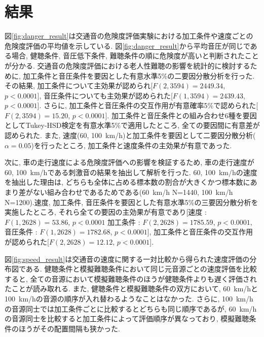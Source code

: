 \documentclass[10pt,twocolumn,uplatex,dvipdfmx]{jsarticle} %
\begin{document}
\section{結果}

図\ref{fig:danger_result}は交通音の危険度評価実験における加工条件や速度ごとの危険度評価の平均値を示している.
図\ref{fig:danger_result}から平均音圧が同じである場合, 健聴条件, 音圧低下条件, 難聴条件の順に危険度が高いと判断されたことが分かる. 交通音の危険度評価における老人性難聴の影響を統計的に検討するために, 加工条件と音圧条件を要因とした有意水準5\%の二要因分散分析を行った. その結果, 加工条件について主効果が認められ[$F(2, 3594) = 2449.34$, $p<0.0001$], 音圧条件についても主効果が認められた[$F(1, 3594) = 2439.43$, $p<0.0001$]. さらに, 加工条件と音圧条件の交互作用が有意確率5\%で認められた[$F(2, 3594) = 15.20$, $ p<0.0001$]. 加工条件と音圧条件との組み合わせ6種を要因としてTukey-HSD検定を有意水準5\%で適用したところ, 全ての要因間に有意差が認められた.
また, 速度(60, 100~km/h)と加工条件を要因として二要因分散分析($\alpha=0.05$)を行ったところ, 加工条件と速度条件の主効果が有意であった.
\par
次に, 車の走行速度による危険度評価への影響を検証するため, 車の走行速度が60, 100~km/hである刺激音の結果を抽出して解析を行った. 60, 100~km/hの速度を抽出した理由は, どちらも全体に占める標本数の割合が大きくかつ標本数にあまり差がない組み合わせであるためである(60~km/h N=1440, 100~km/h N=1200).速度, 加工条件, 音圧条件を要因とした有意水準5\%の三要因分散分析を実施したところ, それら全ての要因の主効果が有意であり[速度 : $F(1, 2628) = 53.86$,  $p<0.0001$  加工条件 : $F(2, 2628) = 1785.59$, $p<0.0001$, 音圧条件 : $F(1, 2628) = 1782.68$, $p<0.0001$], 加工条件と音圧条件の交互作用が認められた[$F(2, 2628) = 12.12$, $p<0.0001$].
\par
図\ref{fig:speed_result}は交通音の速度に関する一対比較から得られた速度評価の分布図である. 健聴条件と模擬難聴条件において同じ元音源ごとの速度評価を比較すると, 全ての音源において模擬難聴条件のほうが健聴条件よりも遅く評価されたことが読み取れる. また, 健聴条件と模擬難聴条件の双方において, 60~km/hと100~km/hの音源の順序が入れ替わるようなことはなかった. さらに, 100~km/hの音源同士では加工条件ごとに比較するとどちらも同じ順序であるが, 60~km/hの音源同士を比較すると加工条件によって評価順序が異なっており, 模擬難聴条件のほうがその配置間隔も狭かった.
\end{document}
